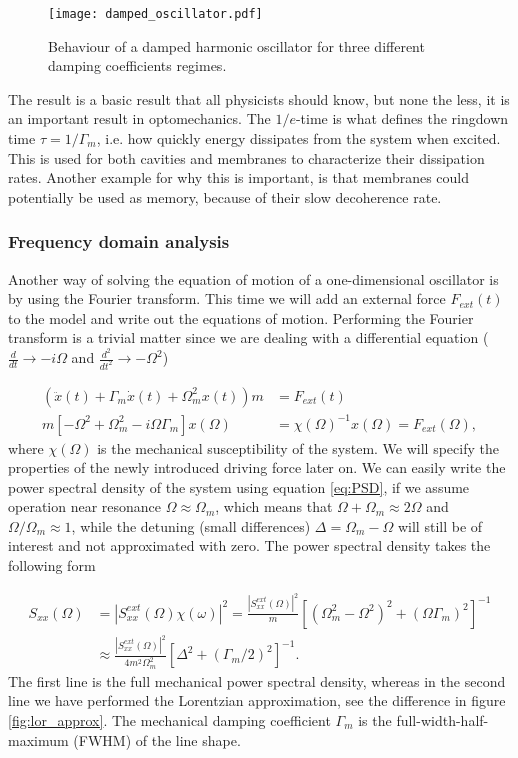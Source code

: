 \begin{figure}[H]
\centering
\texttt{[image: damped\_oscillator.pdf]}
\caption{Behaviour of a damped harmonic oscillator for three different damping coefficients regimes.}
\label{fig:damped_osc}
\end{figure}

The result is a basic result that all physicists should know, but none the less, it is an important result in optomechanics. The $1/e$-time is what defines the ringdown time $\tau = 1/\Gamma_m$, i.e. how quickly energy dissipates from the system when excited. This is used for both cavities and membranes to characterize their dissipation rates. Another example for why this is important, is that membranes could potentially be used as memory, because of their slow decoherence rate.

\subsubsection{Frequency domain analysis}
Another way of solving the equation of motion of a one-dimensional oscillator is by using the Fourier transform. This time we will add an external force $F_{ext}(t)$ to the model and write out the equations of motion. Performing the Fourier transform is a trivial matter since we are dealing with a differential equation ($\frac{d}{dt} \rightarrow -i\Omega$ and $\frac{d^2}{dt^2} \rightarrow -\Omega^2$)

\begin{align}
\left(\ddot{x}(t) + \Gamma_m\dot{x}(t) + \Omega_{m}^2x(t)\right)m & = F_{ext}(t) \\
m\left[-\Omega^2 + \Omega_{m}^2 -i\Omega\Gamma_m\right]x(\Omega) & = \chi(\Omega)^{-1}x(\Omega) = F_{ext}(\Omega),
\end{align}
\noindent
where $\chi(\Omega)$ is the mechanical susceptibility of the system. We will specify the properties of the newly introduced driving force later on. We can easily write the power spectral density of the system using equation \eqref{eq:PSD}, if we assume operation near resonance $\Omega \approx \Omega_{m}$, which means that $\Omega + \Omega_{m} \approx 2\Omega$ and $\Omega/\Omega_{m} \approx 1$, while the detuning (small differences) $\Delta = \Omega_{m} - \Omega$ will still be of interest and not approximated with zero. The power spectral density takes the following form

\begin{equation}
\begin{split}
S_{xx}(\Omega) & = \left|S_{xx}^{ext}(\Omega)\chi(\omega)\right|^2 = \frac{\left|S_{xx}^{ext}(\Omega)\right|^2}{m}\left[(\Omega_{m}^2 - \Omega^2)^2 + (\Omega\Gamma_m)^2\right]^{-1} \\
& \approx \frac{\left|S_{xx}^{ext}(\Omega)\right|^2}{4m^2\Omega_{m}^2}\left[\Delta^2 + (\Gamma_m/2)^2\right]^{-1}.
\end{split}
\end{equation}
\noindent
The first line is the full mechanical power spectral density, whereas in the second line we have performed the Lorentzian approximation, see the difference in figure \ref{fig:lor_approx}. The mechanical damping coefficient $\Gamma_m$ is the full-width-half-maximum (FWHM) of the line shape.

